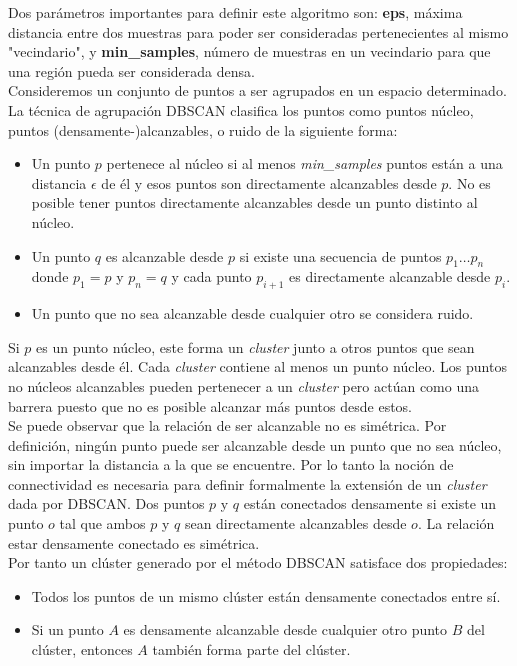 \documentclass[a4paper, 20pt]{article}
\begin{document}
{Dos parámetros importantes para definir este algoritmo son: \textbf{eps}, máxima distancia entre dos muestras para poder ser consideradas pertenecientes al mismo "vecindario", y \textbf{min\_samples}, número de muestras en un vecindario para que una región pueda ser considerada densa.\\

Consideremos un conjunto de puntos a ser agrupados en un espacio determinado. La técnica de agrupación DBSCAN clasifica los puntos como puntos núcleo, puntos (densamente-)alcanzables, o ruido de la siguiente forma:

\begin{itemize}
\item Un punto $p$ pertenece al núcleo si al menos \textit{min\_samples} puntos están a una distancia $\epsilon$ de él y esos puntos son directamente alcanzables desde $p$. No es posible tener puntos directamente alcanzables desde un punto distinto al núcleo.
\item Un punto $q$ es alcanzable desde $p$ si existe una secuencia de puntos $p_1\dots p_n$ donde $p_1=p$ y $p_n=q$ y cada punto $p_{i+1}$ es directamente alcanzable desde $p_i$.
\item Un punto que no sea alcanzable desde cualquier otro se considera ruido.
\end{itemize}

Si $p$ es un punto núcleo, este forma un \textit{cluster} junto a otros puntos que sean alcanzables desde él. Cada \textit{cluster} contiene al menos un punto núcleo. Los puntos no núcleos alcanzables pueden pertenecer a un \textit{cluster} pero actúan como una barrera puesto que no es posible alcanzar más puntos desde estos.\\

Se puede observar que la relación de ser alcanzable no es simétrica. Por definición, ningún punto puede ser alcanzable desde un punto que no sea núcleo, sin importar la distancia a la que se encuentre. Por lo tanto la noción de connectividad es necesaria para definir formalmente la extensión de un \textit{cluster} dada por DBSCAN. Dos puntos $p$ y $q$ están conectados densamente si existe un punto $o$ tal que ambos $p$ y $q$ sean directamente alcanzables desde $o$. La relación estar densamente conectado es simétrica.\\

Por tanto un clúster generado por el método DBSCAN satisface dos propiedades:

\begin{itemize}
\item Todos los puntos de un mismo clúster están densamente conectados entre sí.
\item Si un punto $A$ es densamente alcanzable desde cualquier otro punto $B$ del clúster, entonces $A$ también forma parte del clúster.
\end{itemize}

}
\end{document}

